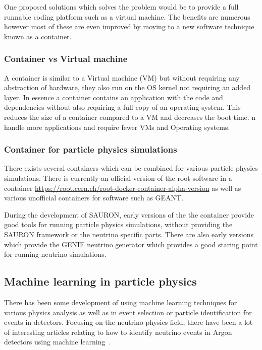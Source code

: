 One proposed solutions which solves the problem would be to provide a full runnable coding platform such as a virtual machine. The benefits are numerous however most of these are even improved by moving to a new software technique known as a container.

\subsubsection{Container vs Virtual machine}

A container is similar to a Virtual machine (VM) but without requiring any abstraction of hardware, they also run on the OS kernel not requiring an added layer. In essence a container contains an application with the code and dependencies without also requiring a full copy of an operating system. This reduces the size of a container compared to a VM and decreases the boot time.
n handle more applications and require fewer VMs and Operating systems.

\subsubsection{Container for particle physics simulations}
There exists several containers which can be combined for various particle physics simulations. There is currently an official version of the root software in a container \url{https://root.cern.ch/root-docker-container-alpha-version} as well as various unofficial containers for software such as GEANT.

During the development of SAURON, early versions of the the container provide good tools for running particle physics simulations, without providing the SAURON framework or the neutrino specific parts. There are also early versions which provide the GENIE neutrino generator which provides a good staring point for running neutrino simulations.


\subsection{Machine learning in particle physics}

There has been some development of using machine learning techniques for various physics analysis as well as in event selection or particle identification for events in detectors. Focusing on the neutrino physics field, there have been a lot of interesting articles relating to how to identify neutrino events in Argon detectors using machine learning~\cite{83Radovic2018, 84Adams}. 

